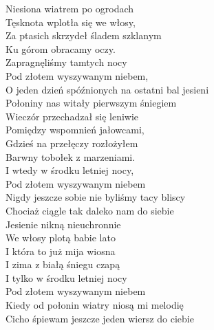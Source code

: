 \begin{text}
    Niesiona wiatrem po ogrodach\\
    Tęsknota wplotła się we włosy,\\
    Za ptasich skrzydeł śladem szklanym\\
    Ku górom obracamy oczy.\\
    Zapragnęliśmy tamtych nocy\\
    Pod złotem wyszywanym niebem,\\
    O jeden dzień spóźnionych na ostatni bal jesieni\\
    Połoniny nas witały pierwszym śniegiem\\
    Wieczór przechadzał się leniwie\\
    Pomiędzy wspomnień jałowcami,\\
    Gdzieś na przełęczy rozłożyłem\\
    Barwny tobołek z marzeniami.\\
    I wtedy w środku letniej nocy,\\
    Pod złotem wyszywanym niebem\\
    Nigdy jeszcze sobie nie byliśmy tacy bliscy\\
    Chociaż ciągle tak daleko nam do siebie\\
    Jesienie nikną nieuchronnie\\
    We włosy plotą babie lato\\
    I która to już mija wiosna\\
    I zima z białą śniegu czapą\\
    I tylko w środku letniej nocy\\
    Pod złotem wyszywanym niebem\\
    Kiedy od połonin wiatry niosą mi melodię\\
    Cicho śpiewam jeszcze jeden wiersz do ciebie
\end{text}
